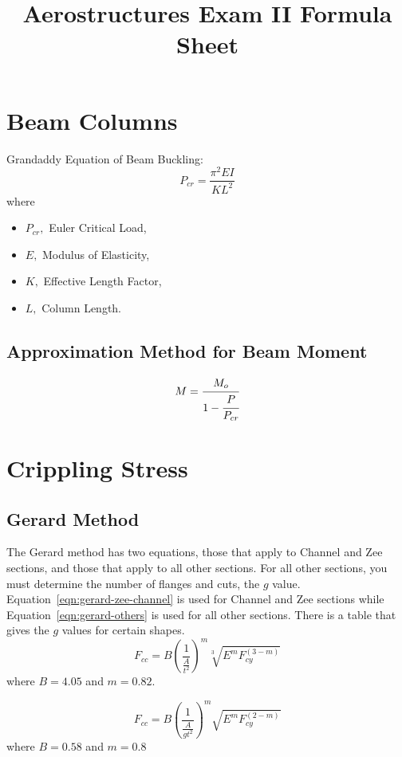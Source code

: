\documentclass{article}
\title{Aerostructures Exam II Formula Sheet}
\author{}
\date{}
\begin{document}
\maketitle
\section{Beam Columns}
Grandaddy Equation of Beam Buckling:
\begin{equation}\label{eqn:grandaddy}
P_{cr} = \frac{\pi ^ 2 EI}{KL^2}
\end{equation}
where
\begin{itemize}
    \item $P_{cr},$ Euler Critical Load,
    \item $E,$ Modulus of Elasticity,
    \item $K,$ Effective Length Factor,
    \item $L,$ Column Length.
\end{itemize}
\subsection{Approximation Method for Beam Moment}
\begin{equation}
    M = \cfrac{M_o}{1 - \cfrac{P}{P_{cr}}}
\end{equation}


\section{Crippling Stress}
\subsection{Gerard Method}
The Gerard method has two equations, those that apply to Channel and Zee sections, and those that apply to all other sections.
For all other sections, you must determine the number of flanges and cuts, the $g$ value.
Equation~\ref{eqn:gerard-zee-channel} is used for Channel and Zee sections while Equation~\ref{eqn:gerard-others} is used for all other sections.
There is a table that gives the $g$ values for certain shapes.
\begin{equation}\label{eqn:gerard-zee-channel}
    F_{cc} = B\left(\frac{1}{\frac{A}{t^2}}\right)^m\sqrt[3]{E^mF_{cy}^{(3-m)}}
\end{equation}
where $B = 4.05$ and $m=0.82$.

\begin{equation}\label{eqn:gerard-others}
   F_{cc} = B\left(\frac{1}{\frac{A}{gt^2}}\right)^m\sqrt{E^mF_{cy}^{(2-m)}}
\end{equation}
where $B = 0.58$ and $ m = 0.8$
\end{document}
